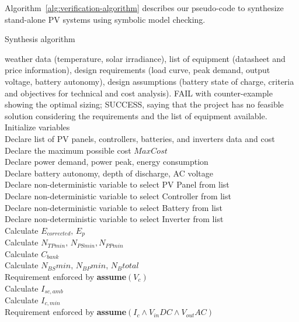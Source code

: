 \documentclass[runningheads]{llncs}
\begin{document}
Algorithm~\ref{alg:verification-algorithm} describes our pseudo-code to synthesize stand-alone PV systems using symbolic model checking. 
%
 \begin{algorithm}
 \caption{Synthesis algorithm}
 \begin{algorithmic}[1]
 \begin{scriptsize}
 \renewcommand{\algorithmicrequire}{\textbf{Input:}}
 \renewcommand{\algorithmicensure}{\textbf{Output:}}
  \REQUIRE weather data (temperature, solar irradiance), list of equipment (datasheet and price information), design requirements (load curve, peak demand, output voltage, battery autonomy), design assumptions (battery state of charge, criteria and objectives for technical and cost analysis).
 \ENSURE FAIL with counter-example showing the optimal sizing; SUCCESS, saying that the project has no feasible solution considering the requirements and the list of equipment available.
 \STATE Initialize variables \\
 \STATE Declare list of PV panels, controllers, batteries, and inverters data and cost \\
 \STATE Declare the maximum possible cost $MaxCost$ \\
 \STATE Declare power demand, power peak, energy consumption \\
 \STATE Declare battery autonomy, depth of discharge, AC voltage \\
 	\STATE Declare non-deterministic variable to select PV Panel from list \\
 	\STATE Declare non-deterministic variable to select Controller from list \\
 	\STATE Declare non-deterministic variable to select Battery from list \\
 	\STATE Declare non-deterministic variable to select Inverter from list \\ 	
 	\STATE Calculate $E_{corrected}, \, E_{p} $ \\
	\STATE Calculate $N_{TPmin}, \, N_{PSmin}, N_{PPmin} $ \\
 	\STATE Calculate $C_{bank}$ \\
	\STATE Calculate $N_{BS}min, \, N_{BP}min, \, N_{B}total$ \\
	\STATE Requirement enforced by \textbf{assume}$(V_{c})$ \\
 	\STATE Calculate $I_{sc,amb}$ \\
 	\STATE Calculate $I_{c,min}$ \\
 	\STATE Requirement enforced by \textbf{assume}$(I_{c} \wedge V_{in}DC \wedge V_{out}AC)$ \\

\end{scriptsize}
\end{algorithmic}
\end{algorithm}
\end{document}
